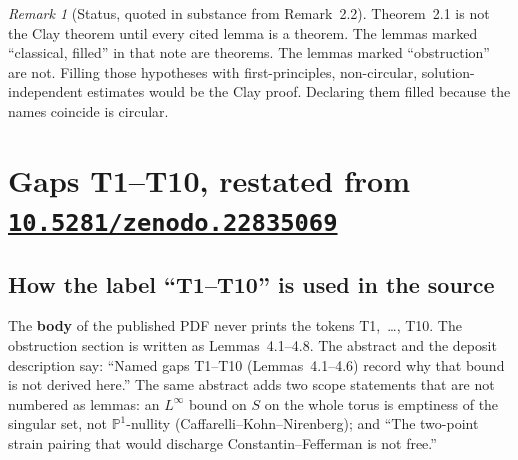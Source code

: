 \documentclass[11pt]{article}
\theoremstyle{plain}
\theoremstyle{definition}
\theoremstyle{remark}
\newtheorem{remark}[theorem]{Remark}
\newcommand{\doi}[1]{\href{https://doi.org/#1}{\texttt{#1}}}
\begin{document}
\begin{remark}[Status, quoted in substance from Remark~2.2]
Theorem~2.1 is not the Clay theorem until every cited lemma is a theorem. The lemmas marked ``classical, filled'' in that note are theorems. The lemmas marked ``obstruction'' are not. Filling those hypotheses with first-principles, non-circular, solution-independent estimates would be the Clay proof. Declaring them filled because the names coincide is circular.
\end{remark}

\section{Gaps T1--T10, restated from \doi{10.5281/zenodo.22835069}}

\subsection{How the label ``T1--T10'' is used in the source}

The \textbf{body} of the published PDF never prints the tokens T1,~\dots, T10. The obstruction section is written as Lemmas~4.1--4.8. The abstract and the deposit description say: ``Named gaps T1--T10 (Lemmas~4.1--4.6) record why that bound is not derived here.'' The same abstract adds two scope statements that are not numbered as lemmas: an \(L^{\infty}\) bound on \(S\) on the whole torus is emptiness of the singular set, not \(\mathbb{P}^{1}\)-nullity (Caffarelli--Kohn--Nirenberg); and ``The two-point strain pairing that would discharge Constantin--Fefferman is not free.''
\end{document}
